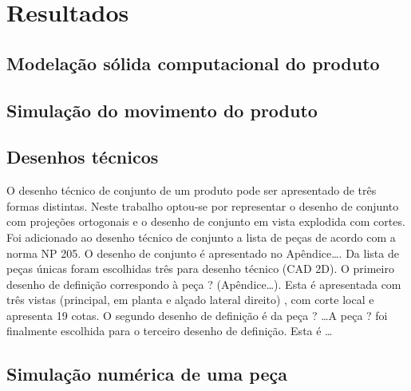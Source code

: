 \cleardoublepage\chapter{Resultados}

\section{Modelação sólida computacional do produto}

\section{Simulação do movimento do produto}

\section{Desenhos técnicos}

O desenho técnico de conjunto de um produto pode ser apresentado de três
formas distintas. Neste trabalho optou-se por representar o desenho de
conjunto com projeções ortogonais e o desenho de conjunto em vista
explodida com cortes. Foi adicionado ao desenho técnico de conjunto a lista de
peças de
acordo com a norma NP 205. O desenho de conjunto é apresentado no Apêndice\ldots.
Da lista de peças únicas foram escolhidas três para desenho técnico (CAD 2D). O
primeiro desenho de definição correspondo à peça ?
(Apêndice\ldots). Esta é apresentada com três vistas (principal, em planta e alçado lateral direito)
, com corte local e apresenta 19 cotas. O segundo desenho de definição é da
peça ? \ldots A peça ? foi finalmente escolhida para o terceiro
desenho de definição. Esta é \ldots


\section{Simulação numérica de uma peça}
